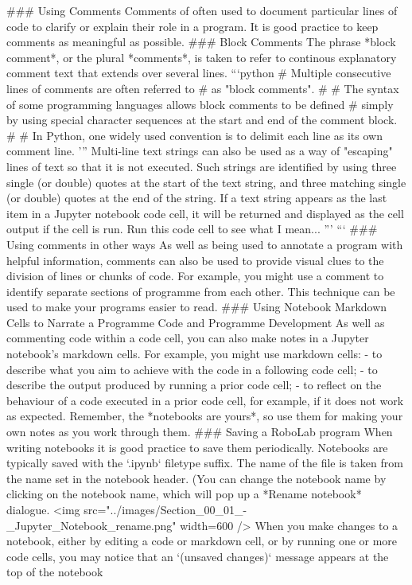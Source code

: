 \documentclass[letterpaper,10pt,english]{sphinxmanual}
\begin{document}
{### Using Comments
Comments of often used to document particular lines of code to clarify or explain their role in a program. It is good practice to keep comments as meaningful as possible.
### Block Comments
The phrase *block comment*, or the plural *comments*, is taken to refer to continous explanatory comment text that extends over several lines.
```python
# Multiple consecutive lines of comments are often referred to
# as "block comments".
#
# The syntax of some programming languages allows block comments to be defined
# simply by using special character sequences at the start and end of the comment block.
#
# In Python, one widely used convention is to delimit each line as its own comment line.
'''
Multi-line text strings can also be used as a way of "escaping" lines of text
so that it is not executed.
Such strings are identified by using three single (or double) quotes at the start of the
text string, and three matching single (or double) quotes at the end of the string.
If a text string appears as the last item in a Jupyter notebook code cell,
it will be returned and displayed as the cell output if the cell is run.
Run this code cell to see what I mean...
'''
```
### Using comments in other ways
As well as being used to annotate a program with helpful information, comments can also be used to provide visual clues to the division of lines or chunks of code. For example, you might use a comment to identify separate sections of programme from each other. This technique can be used to make your programs easier to read.
### Using Notebook Markdown Cells to Narrate a Programme Code and Programme Development
As well as commenting code within a code cell, you can also make notes in a Jupyter notebook's markdown cells. For example, you might use markdown cells:
- to describe what you aim to achieve with the code in a following code cell;
- to describe the output produced by running a prior code cell;
- to reflect on the behaviour of a code executed in a prior code cell, for example, if it does not work as expected.
Remember, the *notebooks are yours*, so use them for making your own notes as you work through them.
### Saving a RoboLab program
When writing notebooks it is good practice to save them periodically.
Notebooks are typically saved with the `.ipynb` filetype suffix. The name of the file is taken from the name set in the notebook header. (You can change the notebook name by clicking on the notebook name, which will pop up a *Rename notebook* dialogue.
<img src="../images/Section_00_01_-_Jupyter_Notebook_rename.png" width=600 />
When you make changes to a notebook, either by editing a code or markdown cell, or by running one or more code cells, you may notice that an `(unsaved changes)` message appears at the top of the notebook
}
\end{document}
